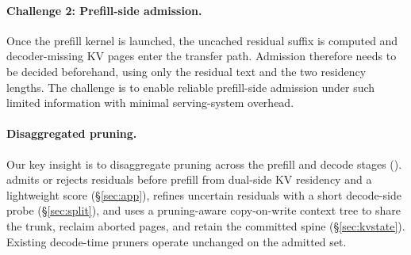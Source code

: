 \paragraph{Challenge 2: Prefill-side admission.}
Once the prefill kernel is launched, the uncached residual suffix is computed and decoder-missing KV pages enter the transfer path.
Admission therefore needs to be decided beforehand, using only the residual text and the two residency lengths.
The challenge is to enable reliable prefill-side admission under such limited information with minimal serving-system overhead.


\paragraph{Disaggregated pruning.}
Our key insight is to disaggregate pruning across the prefill and decode stages ().
\sys admits or rejects residuals before prefill from dual-side KV residency and a lightweight score (\S\ref{sec:app}), refines uncertain residuals with a short decode-side probe (\S\ref{sec:split}), and uses a pruning-aware copy-on-write context tree to share the trunk, reclaim aborted pages, and retain the committed spine (\S\ref{sec:kvstate}).
Existing decode-time pruners operate unchanged on the admitted set.


